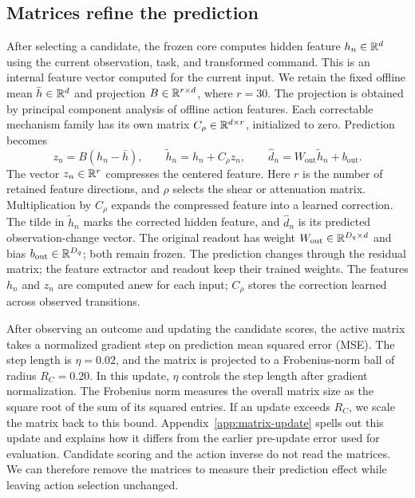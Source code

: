 \subsection{Matrices refine the prediction}
After selecting a candidate, the frozen core computes hidden feature
$h_n\in\mathbb{R}^d$ using the current observation, task, and transformed command.
This is an internal feature vector computed for the current input.
We retain the fixed offline mean
$\bar h\in\mathbb{R}^d$ and projection $B\in\mathbb{R}^{r\times d}$, where $r=30$.
The projection is obtained by principal component analysis of offline action
features. Each correctable mechanism family has its own matrix
$C_\rho\in\mathbb{R}^{d\times r}$, initialized to zero. Prediction becomes
\begin{equation}
 z_n=B(h_n-\bar h),\qquad
 \tilde h_n=h_n+C_\rho z_n,\qquad
 \hat d_n=W_{\mathrm{out}}\tilde h_n+b_{\mathrm{out}}.
 \label{eq:correction}
\end{equation}
The vector $z_n\in\mathbb{R}^r$ compresses the centered feature. Here $r$ is the number
of retained feature directions, and $\rho$ selects the shear or attenuation
matrix. Multiplication by $C_\rho$ expands the compressed feature into a learned
correction. The tilde in $\tilde h_n$ marks the corrected hidden feature, and
$\hat d_n$ is its predicted observation-change vector.
The original readout has weight $W_{\mathrm{out}}\in\mathbb{R}^{D_q\times d}$ and
bias $b_{\mathrm{out}}\in\mathbb{R}^{D_q}$; both remain frozen.
The prediction changes through the residual matrix; the feature extractor
and readout keep their trained weights. The features $h_n$ and $z_n$ are
computed anew for each input; $C_\rho$ stores the correction learned across
observed transitions.

After observing an outcome and updating the candidate scores, the active
matrix takes a normalized gradient step on prediction mean squared error
(MSE). The step length is
$\eta=0.02$, and the matrix is projected to a Frobenius-norm ball of radius
$R_C=0.20$. In this update, $\eta$ controls the step length after gradient normalization.
The Frobenius norm measures the overall matrix size as the square root of the
sum of its squared entries. If an update exceeds $R_C$, we scale the matrix
back to this bound. Appendix~\ref{app:matrix-update} spells out this update and explains
how it differs from the earlier pre-update error used for evaluation. Candidate scoring and the action inverse do not read the matrices. We can
therefore remove the matrices to measure their prediction effect while
leaving action selection unchanged.

